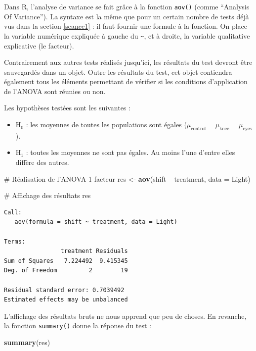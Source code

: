 \documentclass[
  a4paper,
]{article}
\newenvironment{Shaded}{\begin{snugshade}}{\end{snugshade}}
\newcommand{\CommentTok}[1]{\textcolor[rgb]{0.54,0.53,0.53}{#1}}
\newcommand{\DataTypeTok}[1]{\textcolor[rgb]{0.00,0.34,0.68}{#1}}
\newcommand{\KeywordTok}[1]{\textcolor[rgb]{0.12,0.11,0.11}{\textbf{#1}}}
\newcommand{\NormalTok}[1]{\textcolor[rgb]{0.12,0.11,0.11}{#1}}
\newcommand{\OperatorTok}[1]{\textcolor[rgb]{0.12,0.11,0.11}{#1}}
\newcommand{\StringTok}[1]{\textcolor[rgb]{0.75,0.01,0.01}{#1}}
\providecommand{\tightlist}{%
  \setlength{\itemsep}{0pt}\setlength{\parskip}{0pt}}
\begin{document}
Dans R, l'analyse de variance se fait grâce à la fonction \texttt{aov()} (comme ``Analysis Of Variance''). La syntaxe est la même que pour un certain nombre de tests déjà vus dans la section \ref{seance1} : il faut fournir une formule à la fonction. On place la variable numérique expliquée à gauche du \texttt{\textasciitilde{}}, et à droite, la variable qualitative explicative (le facteur).

Contrairement aux autres tests réalisés jusqu'ici, les résultats du test devront être sauvegardés dans un objet. Outre les résultats du test, cet objet contiendra également tous les éléments permettant de vérifier si les conditions d'application de l'ANOVA sont réunies ou non.

Les hypothèses testées sont les suivantes :

\begin{itemize}
\tightlist
\item
  H\(_0\) : les moyennes de toutes les populations sont égales (\(\mu_{\textrm{control}} = \mu_{\textrm{knee}} = \mu_{\textrm{eyes}}\)).
\item
  H\(_1\) : toutes les moyennes ne sont pas égales. Au moins l'une d'entre elles diffère des autres.
\end{itemize}

\begin{Shaded}
\begin{Highlighting}[]
\CommentTok{# Réalisation de l'ANOVA 1 facteur}
\NormalTok{res <-}\StringTok{ }\KeywordTok{aov}\NormalTok{(shift }\OperatorTok{~}\StringTok{ }\NormalTok{treatment, }\DataTypeTok{data =}\NormalTok{ Light)}

\CommentTok{# Affichage des résultats}
\NormalTok{res}
\end{Highlighting}
\end{Shaded}

\begin{verbatim}
Call:
   aov(formula = shift ~ treatment, data = Light)

Terms:
                treatment Residuals
Sum of Squares   7.224492  9.415345
Deg. of Freedom         2        19

Residual standard error: 0.7039492
Estimated effects may be unbalanced
\end{verbatim}

L'affichage des résultats bruts ne nous apprend que peu de choses. En revanche, la fonction \texttt{summary()} donne la réponse du test :

\begin{Shaded}
\begin{Highlighting}[]
\KeywordTok{summary}\NormalTok{(res)}
\end{Highlighting}
\end{Shaded}
\end{document}
